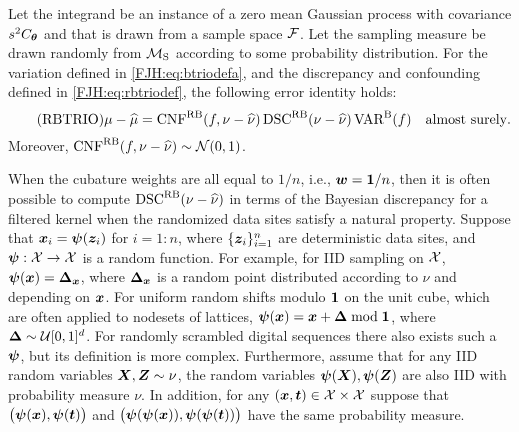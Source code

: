 \documentclass[graybox,footinfo]{svmult}
\begin{document}
\begin{theorem}  \label{FJH:thm:rbtrio} Let 
the integrand be 
	an instance of a zero mean Gaussian process with covariance $s^2C_{{\boldsymbol{\theta}}}$ and 
	that is drawn from a sample space ${\mathcal{F}}$.  Let the sampling measure be drawn 
	randomly from ${\mathcal{M}}_{\textup{S}}$ according to some probability distribution.  For 
	the  
	variation defined in \eqref{FJH:eq:btriodefa}, and the discrepancy and 
	confounding defined in \eqref{FJH:eq:rbtriodef}, the following error identity holds: 
	\begin{equation} \tag{RBTRIO} \label{FJH:eq:rbtrio}
	\mu - \hmu  = \algn^{\Rn\Ba}(f,\nu - \hnu) \, \disc^{\Rn\Ba}(\nu - \hnu) \, \Var^{\Ba}(f) 
	\quad 
	\text{almost surely}.
	\end{equation}
	Moreover, $\textup{CNF}^{\textup{R}\textup{B}}(f,\nu - \widehat{\nu}) \sim {\mathcal{N}}(0,1)$. 
\end{theorem}

\begin{FJHLesson}
	\FJHLessonSix
\end{FJHLesson}

When the cubature weights are all equal to $1/n$, i.e., ${\boldsymbol{w}} = {\boldsymbol{1}}/n$, then it is 
often possible to compute 
$\textup{DSC}^{\textup{R}\textup{B}}(\nu - \widehat{\nu})$ in terms of the Bayesian discrepancy for a filtered kernel 
when the randomized data sites satisfy a natural 
property.  Suppose that ${\boldsymbol{x}}_i ={\boldsymbol{\psi}} ({\boldsymbol{z}}_i)$ for $i = 1 \!:\!n$, where 
$\{{\boldsymbol{z}}_i\}_{i=1}^n$ are deterministic data sites, and ${\boldsymbol{\psi}} :{\mathcal{X}} \to {\mathcal{X}}$ is a random 
function.  For example, for IID sampling on ${\mathcal{X}}$, ${\boldsymbol{\psi}}({\boldsymbol{x}}) = {\boldsymbol{\Delta}}_{\boldsymbol{x}}$, 
where 
${\boldsymbol{\Delta}}_{\boldsymbol{x}}$ is a random point distributed according to $\nu$ and depending on 
${\boldsymbol{x}}$.  For uniform random shifts modulo ${\boldsymbol{1}}$ on the unit cube, 
which are often applied to nodesets of lattices, ${\boldsymbol{\psi}}({\boldsymbol{x}}) = {\boldsymbol{x}} + {\boldsymbol{\Delta}} \bmod 
{\boldsymbol{1}}$, 
where ${\boldsymbol{\Delta}} \sim {\mathcal{U}}[0,1]^d$.  For randomly scrambled digital sequences there 
also 
exists such a ${\boldsymbol{\psi}}$, but its definition is more complex.  Furthermore, assume that for 
any IID random variables ${\boldsymbol{X}}, {\boldsymbol{Z}} \sim \nu$,  the random variables ${\boldsymbol{\psi}}({\boldsymbol{X}}), 
{\boldsymbol{\psi}}({\boldsymbol{Z}})$ are also IID with probability measure $\nu$.  In addition, for any $({\boldsymbol{x}}, 
{\boldsymbol{t}}) \in {\mathcal{X}} \times {\mathcal{X}}$ suppose that  $\bigl({\boldsymbol{\psi}}({\boldsymbol{x}}), {\boldsymbol{\psi}}({\boldsymbol{t}}) \bigr)$ and 
$\bigl({\boldsymbol{\psi}}({\boldsymbol{\psi}}({\boldsymbol{x}})), {\boldsymbol{\psi}}({\boldsymbol{\psi}}({\boldsymbol{t}})) \bigr)$ have the same probability measure.
\end{document}
